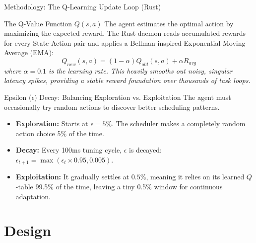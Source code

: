 \documentclass[aspectratio=169]{beamer}
\begin{document}
\begin{frame}{Methodology: The Q-Learning Update Loop (Rust)}
\vspace{-2cm}
    \begin{alertblock}{The Q-Value Function $Q(s, a)$}
        \small
        The agent estimates the optimal action by maximizing the expected reward. The Rust daemon reads accumulated rewards for every State-Action pair and applies a Bellman-inspired Exponential Moving Average (EMA):
        \vspace{0.1cm}
        \[ Q_{new}(s, a) = (1 - \alpha) Q_{old}(s, a) + \alpha R_{avg} \]
        \textit{where $\alpha = 0.1$ is the learning rate. This heavily smooths out noisy, singular latency spikes, providing a stable reward foundation over thousands of task loops.}
    \end{alertblock}
\vspace{-2cm}

    \begin{block}{Epsilon ($\epsilon$) Decay: Balancing Exploration vs. Exploitation}
        \small
        The agent must occasionally try random actions to discover better scheduling patterns.
        \begin{itemize}
            \item \textbf{Exploration:} Starts at $\epsilon = 5\%$. The scheduler makes a completely random action choice 5\% of the time.
            \item \textbf{Decay:} Every 100ms tuning cycle, $\epsilon$ is decayed: $\epsilon_{t+1} = \max(\epsilon_t \times 0.95, 0.005)$.
            \item \textbf{Exploitation:} It gradually settles at $0.5\%$, meaning it relies on its learned $Q$-table 99.5\% of the time, leaving a tiny 0.5\% window for continuous adaptation.
        \end{itemize}
    \end{block}
\end{frame}

\section{Design}
\end{document}
